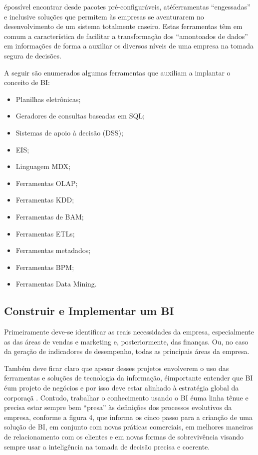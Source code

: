 \'{e}poss\'{i}vel encontrar desde pacotes pr\'{e}-configur\'{a}veis, at\'{e}ferramentas “engessadas” e inclusive solu\c{c}\~{o}es que permitem \`{a}s empresas se aventurarem no desenvolvimento de um sistema totalmente caseiro.
Estas ferramentas têm em comum a caracter\'{i}stica de facilitar a transforma\c{c}\~{a}o dos “amontoados de dados” em informa\c{c}\~{o}es de forma a auxiliar os diversos n\'{i}veis de uma empresa na tomada segura de decis\~{o}es.

A seguir s\~{a}o enumerados algumas ferramentas que auxiliam a implantar o conceito de BI:

\begin{itemize}
    \item Planilhas eletrônicas;
    \item Geradores de consultas baseadas em SQL;
    \item Sistemas de apoio \`{a} decis\~{a}o (DSS);
    \item EIS;
    \item Linguagem MDX;
    \item Ferramentas OLAP;
    \item Ferramentas KDD;
    \item Ferramentas de BAM;
    \item Ferramentas ETLs;
    \item Ferramentas metadados;
    \item Ferramentas BPM;
    \item Ferramentas Data Mining.
\end{itemize}

\subsection{Construir e Implementar um BI}

Primeiramente deve-se identificar as reais necessidades da empresa, especialmente as das \'{a}reas de vendas e marketing e, posteriormente, das finan\c{c}as. Ou, no caso da gera\c{c}\~{a}o de indicadores de desempenho, todas as principais \'{a}reas da empresa. 

Tamb\'{e}m deve ficar claro que apesar desses projetos envolverem o uso das ferramentas e solu\c{c}\~{o}es de tecnologia da informa\c{c}\~{a}o, \'{e}importante entender que BI \'{e}um projeto de neg\'{o}cios e por isso deve estar alinhado \`{a} estrat\'{e}gia global da corpora\c{c}\~{a}
.
Contudo, trabalhar o conhecimento usando o BI \'{e}uma linha tênue e precisa estar sempre bem “presa” \`{a}s defini\c{c}\~{o}es dos processos evolutivos da empresa, conforme a figura 4, que informa os cinco passo para a crian\c{c}\~{a}o de uma solu\c{c}\~{a}o de BI, em conjunto com novas pr\'{a}ticas comerciais, em melhores maneiras de relacionamento com os clientes e em novas formas de sobrevivência visando sempre usar a inteligência na tomada de decis\~{a}o precisa e coerente.

